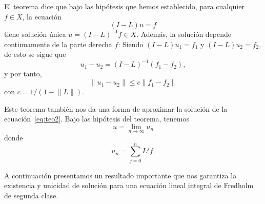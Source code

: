 \begin{observacion}
	El teorema dice que bajo las hipótesis que hemos establecido, para cualquier $f \in X$, la ecuación
	\begin{equation}\label{eq:teo2}
		(I-L)u = f
	\end{equation}
	tiene solución única $u = (I-L)^{-1}f \in X$. Además, la solución depende continuamente de la parte derecha $f$: Siendo $(I-L)u_1 = f_1$ y $(I-L)u_2 = f_2$, de esto se sigue que
	\begin{equation}
		u_1 - u_2 = (I-L)^{-1}(f_1 - f_2),
	\end{equation}
	y por tanto,
	\begin{equation}
		\lVert u_1 - u_2 \rVert \leqslant c \lVert f_1 - f_2 \rVert
	\end{equation}
	con $c = 1/(1 - \lVert L \rVert)$.
\end{observacion}
\begin{observacion}
	Este teorema también nos da una forma de aproximar la solución de la ecuación~\eqref{eq:teo2}. Bajo las hipótesis del teorema, tenemos
	\begin{equation}
		u = \lim_{n \rightarrow \infty}u_n
	\end{equation}
	donde
	\begin{equation}
		u_n = \sum_{j=0}^{n}L^jf.
	\end{equation}
\end{observacion}
A continuación presentamos un resultado importante que nos garantiza la existencia y unicidad de solución para una ecuación lineal integral de Fredholm de segunda clase.
